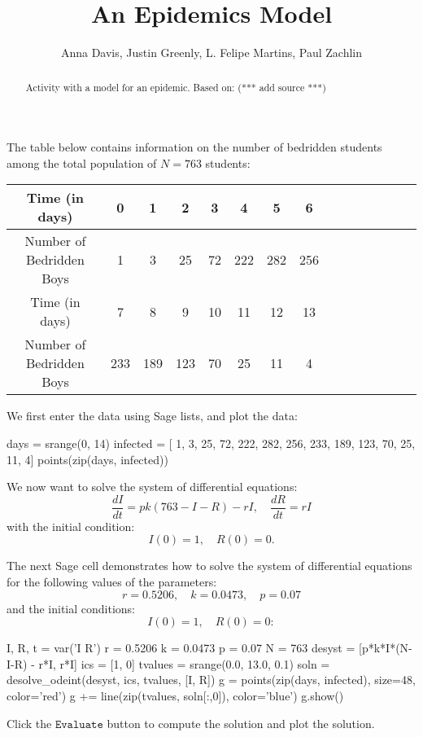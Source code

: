 \documentclass{ximera}
\title{An Epidemics Model}
\author{Anna Davis, Justin Greenly, L. Felipe Martins, Paul Zachlin}
\begin{document}
\begin{abstract}
Activity with a model for an epidemic. Based on: (*** add source ***)
\end{abstract}

\maketitle

The table below contains information on the number of bedridden students among the total population of $N=763$ students:

\begin{tabular}{|c|c|c|c|c|c|c|c|c|c|c|c|c|c|c|}\hline
Time (in days)           & 0 & 1 &  2 &  3 &  4 &    5 &   6  \\\hline
Number of Bedridden Boys & 1 & 3 & 25 & 72 & 222 & 282 & 256 \\\hline\hline
Time (in days) &             7 &   8 &   9 & 10 & 11 & 12 & 13\\\hline
Number of Bedridden Boys & 233 & 189 & 123 & 70 & 25 & 11 &  4\\\hline
\end{tabular}

We first enter the data using Sage lists, and plot the data:

\begin{sageCell}
days = srange(0, 14)
infected = [  1,   3,  25, 72, 222, 282, 256, 
            233, 189, 123, 70,  25,  11,   4]
points(zip(days, infected))
\end{sageCell}

We now want to solve the system of differential equations:
\[
\frac{dI}{dt}=pk(763-I-R)-rI,\quad\frac{dR}{dt}=rI
\]
with the initial condition:
\[
I(0)=1,\quad R(0)=0.
\]

The next Sage cell demonstrates how to solve the system of differential equations for the following values of the parameters:
\[
r = 0.5206,\quad k = 0.0473,\quad p = 0.07
\]
and the initial conditions:
\[
I(0)=1,\quad R(0)=0:
\]

\begin{sageCell}
I, R, t = var('I R')
r = 0.5206
k = 0.0473
p = 0.07
N = 763
desyst = [p*k*I*(N-I-R) - r*I, r*I]
ics = [1, 0]
tvalues = srange(0.0, 13.0, 0.1)
soln = desolve_odeint(desyst, ics, tvalues, [I, R])
g = points(zip(days, infected), size=48, color='red')
g += line(zip(tvalues, soln[:,0]), color='blue')
g.show()
\end{sageCell}

Click the $\mathtt{Evaluate}$ button to compute the solution and plot the solution.
\end{document}
